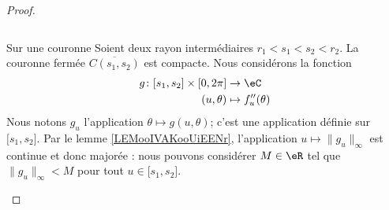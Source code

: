 \begin{proof}
\begin{subproof}
\begin{equation}
        \end{equation}
        \begin{subproof}
        \item[Sur une couronne]
            Soient deux rayon intermédiaires \( r_1<s_1<s_2<r_2\). La couronne fermée \( \overline{ C(s_1,s_2) }\) est compacte. Nous considérons la fonction
            \begin{equation}
                \begin{aligned}
                    g\colon \mathopen[ s_1 , s_2 \mathclose]\times \mathopen[ 0 , 2\pi \mathclose]&\to \eC \\
                    (u,\theta)&\mapsto f''_u(\theta) 
                \end{aligned}
            \end{equation}
            Nous notons \( g_u\) l'application \( \theta\mapsto g(u,\theta)\); c'est une application définie sur \( \mathopen[ s_1 , s_2 \mathclose]\). Par le lemme \ref{LEMooIVAKooUiEENr}, l'application \( u\mapsto \| g_u \|_{\infty}\) est continue et donc majorée : nous pouvons considérer \( M\in \eR\) tel que \( \| g_u \|_{\infty}<M\) pour tout \( u\in \mathopen[ s_1 , s_2 \mathclose]\).


\end{subproof}
\end{subproof}
\end{proof}
